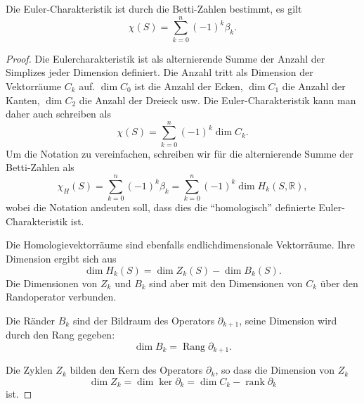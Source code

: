 \begin{satz}
\label{buch:topologie:simplex:satz:euler-betti}
Die Euler-Charakteristik ist durch die Betti-Zahlen bestimmt,
es gilt
\[
\chi(S)
=
\sum_{k=0}^n (-1)^k \beta_k.
\]
\end{satz}

\begin{proof}
Die Eulercharakteristik ist als alternierende Summe der Anzahl der Simplizes 
jeder Dimension definiert.
Die Anzahl tritt als Dimension der Vektorräume $C_k$ auf.
$\dim C_0$ ist die Anzahl der Ecken, $\dim C_1$ die Anzahl der Kanten,
$\dim C_2$ die Anzahl der Dreieck usw.
Die Euler-Charakteristik kann man daher auch schreiben als
\[
\chi(S)
=
\sum_{k=0}^n (-1)^k \dim C_k.
\]
Um die Notation zu vereinfachen, schreiben wir für die alternierende
Summe der Betti-Zahlen als
\[
\chi_H(S)
=
\sum_{k=0}^n
(-1)^k \beta_k
=
\sum_{k=0}^n
(-1)^k \dim H_k(S,\mathbb{R}),
\]
wobei die Notation andeuten soll, dass dies die ``homologisch''
definierte Euler-Cha\-rak\-te\-ris\-tik ist.

Die Homologievektorräume sind ebenfalls endlichdimensionale Vektorräume.
Ihre Dimension ergibt sich aus
\[
\dim H_k(S)
=
\dim Z_k(S) - \dim B_k(S).
\]
Die Dimensionen von $Z_k$ und $B_k$ sind aber mit den Dimensionen von
$C_k$ über den Randoperator verbunden.

Die Ränder $B_k$ sind der Bildraum des Operators $\partial_{k+1}$, seine
Dimension wird durch den Rang gegeben:
\begin{equation}
\dim B_k
= 
\operatorname{Rang} \partial_{k+1}.
\label{buch:topologie:simplex:eqn:dimb}
\end{equation}

Die Zyklen $Z_k$ bilden den Kern des Operators $\partial_k$, so dass
die Dimension von $Z_k$
\begin{equation}
\dim Z_k
=
\dim\ker \partial_k
=
\dim C_k - \operatorname{rank} \partial_k
\label{buch:topologie:simplex:eqn:dimz}
\end{equation}
ist.


\end{proof}
